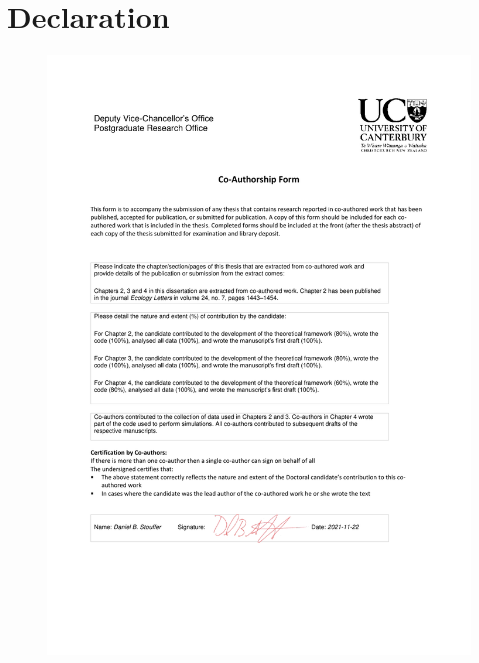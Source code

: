 
\chapter*{Declaration} %


\begin{figure}[!htbp]
    \centering
    \includegraphics[width=\textwidth]{Chapters/declaration.pdf}
\end{figure}



